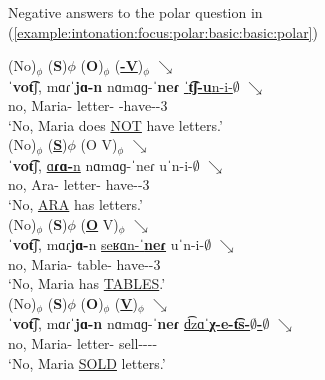 \begin{exe}
	\ex Negative answers to the polar question in  (\ref{example:intonation:focus:polar:basic:basic:polar}) 
	\begin{xlist}
		\ex \glll (No)$_\phi$ (\textbf{S})$\phi$ (\textbf{O})$_\phi$ (\underline{\textbf{{\neggloss}-V}})$_\phi$ $\searrow$  \\
		ˈ\textbf{vot͡}ʃ,  mɑɾˈ\textbf{jɑ-n} nɑmɑɡ-ˈ\textbf{neɾ} \underline{ˈ\textbf{t͡ʃ-u}n-i-$\emptyset$} $\searrow$ \\
		no, Maria-{} letter-{\pl} {\neggloss}-have-{\thgloss}-3{\sg} \\
		\trans `No, Maria does \underline{NOT} have letters.' \\
		\label{example:intonation:focus:polar:basic:basic:ans:neg}
		\ex \glll (No)$_\phi$ (\underline{\textbf{S}})$\phi$ ({O} V)$_\phi$ $\searrow$  \\
		ˈ\textbf{vot͡}ʃ,  \underline{ɑ\textbf{ɾɑ-}n}  nɑmɑɡ-ˈ{neɾ} {uˈn-i-$\emptyset$} $\searrow$ \\
		no, Ara-{} letter-{\pl}  have-{\thgloss}-3{\sg} \\
		\trans `No, \underline{ARA} has    letters.' \\
		\label{example:intonation:focus:polar:basic:basic:ans:subj}
		\ex \glll (No)$_\phi$ ({\textbf{S}})$\phi$ (\underline{\textbf{O}} V)$_\phi$ $\searrow$  \\
		ˈ\textbf{vot͡}ʃ, mɑɾ\textbf{jɑ-}n  \underline{seʁɑn-ˈ\textbf{neɾ}} {uˈn-i-$\emptyset$} $\searrow$ \\
		no, Maria-{} table-{\pl}  have-{\thgloss}-3{\sg} \\
		\trans `No, Maria  has \underline{TABLES}.' \\
		\label{example:intonation:focus:polar:basic:basic:ans:objj}
		\ex \glll (No)$_\phi$ (\textbf{S})$\phi$ (\textbf{O})$_\phi$ (\underline{\textbf{V}})$_\phi$ $\searrow$  \\
		ˈ\textbf{vot͡}ʃ,  mɑɾˈ\textbf{jɑ-n} nɑmɑɡ-ˈ\textbf{neɾ} \underline{d͡zɑˈ\textbf{χ-e-t͡s-$\emptyset$-$\emptyset$}}  $\searrow$ \\
		no, Maria-{} letter-{\pl} sell-{\thgloss}-{\aorperf}-{\pst}-{\sg} \\
		\trans `No, Maria  \underline{SOLD}  letters.' \\
		\label{example:intonation:focus:polar:basic:basic:ans:verb}
	\end{xlist}
\end{exe}

